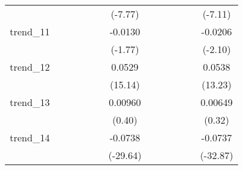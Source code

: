 {\begin{tabular}{l*{12}{c}}
            &                     &                     &                     &                     &                     &     (-7.77)         &                     &                     &                     &                     &                     &     (-7.11)         \\
[1em]
trend\_11    &                     &                     &                     &                     &                     &     -0.0130         &                     &                     &                     &                     &                     &     -0.0206\sym{*}  \\
            &                     &                     &                     &                     &                     &     (-1.77)         &                     &                     &                     &                     &                     &     (-2.10)         \\
[1em]
trend\_12    &                     &                     &                     &                     &                     &      0.0529\sym{***}&                     &                     &                     &                     &                     &      0.0538\sym{***}\\
            &                     &                     &                     &                     &                     &     (15.14)         &                     &                     &                     &                     &                     &     (13.23)         \\
[1em]
trend\_13    &                     &                     &                     &                     &                     &     0.00960         &                     &                     &                     &                     &                     &     0.00649         \\
            &                     &                     &                     &                     &                     &      (0.40)         &                     &                     &                     &                     &                     &      (0.32)         \\
[1em]
trend\_14    &                     &                     &                     &                     &                     &     -0.0738\sym{***}&                     &                     &                     &                     &                     &     -0.0737\sym{***}\\
            &                     &                     &                     &                     &                     &    (-29.64)         &                     &                     &                     &                     &                     &    (-32.87)         \\

\end{tabular}}
